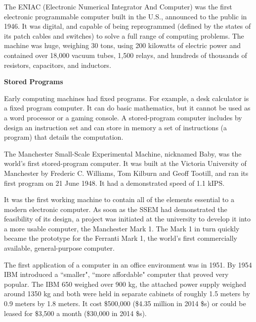 \documentclass[12pt, ]{article}
\begin{document}
The ENIAC (Electronic Numerical Integrator And Computer) was the first electronic programmable computer built in the U.S., announced to the public in 1946. It was digital, and capable of being reprogrammed (defined by the states of its patch cables and switches) to solve a full range of computing problems. %
The machine was huge, weighing 30 tons, using 200 kilowatts of electric power and contained over 18,000 vacuum tubes, 1,500 relays, and hundreds of thousands of resistors, capacitors, and inductors.

\vspace*{2em}
\noindent \textbf{Stored Programs}

Early computing machines had fixed programs. For example, a desk calculator is a fixed program computer. It can do basic mathematics, but it cannot be used as a word processor or a gaming console. A stored-program computer includes by design an instruction set and can store in memory a set of instructions (a program) that details the computation.

The Manchester Small-Scale Experimental Machine, nicknamed Baby, was the world's first stored-program computer. It was built at the Victoria University of Manchester by Frederic C. Williams, Tom Kilburn and Geoff Tootill, and ran its first program on 21 June 1948. It had a demonstrated speed of 1.1 kIPS.

It was the first working machine to contain all of the elements essential to a modern electronic computer. As soon as the SSEM had demonstrated the feasibility of its design, a project was initiated at the university to develop it into a more usable computer, the Manchester Mark 1. The Mark 1 in turn quickly became the prototype for the Ferranti Mark 1, the world's first commercially available, general-purpose computer.

The first application of a computer in an office environment was in 1951. By 1954 IBM introduced a ``smaller", ``more affordable" computer that proved very popular. The IBM 650 weighed over 900 kg, the attached power supply weighed around 1350 kg and both were held in separate cabinets of roughly 1.5 meters by 0.9 meters by 1.8 meters. It cost \$500,000 (\$4.35 million in 2014 \$s) or could be leased for \$3,500 a month (\$30,000 in 2014 \$s).
\end{document}

